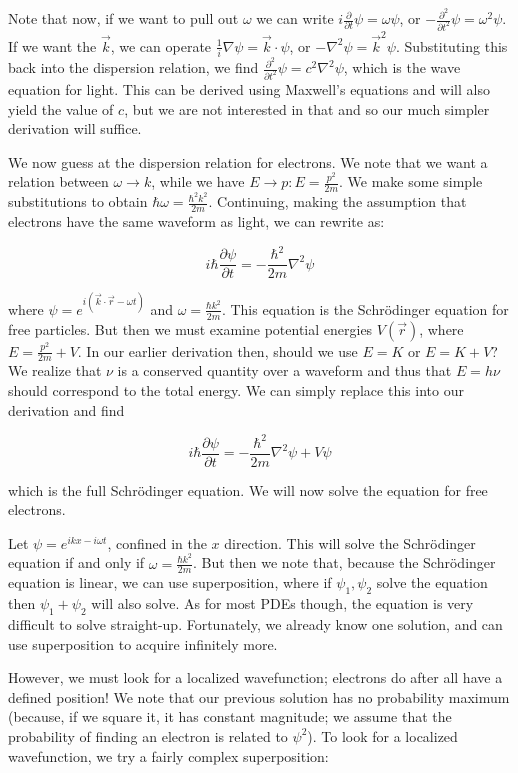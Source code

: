 \documentclass{report}
\begin{document}
Note that now, if we want to pull out $\omega$ we can write $i\frac{\partial}{\partial t}\psi = \omega \psi$, or $-\frac{\partial^2}{\partial t^2}\psi = \omega^2 \psi$. If we want the $\vec{k}$, we can operate $\frac{1}{i}\nabla\psi = \vec{k}\cdot\psi$, or $-\nabla^2\psi = \vec{k}^2\psi$. Substituting this back into the dispersion relation, we find $\frac{\partial^2}{\partial t^2}\psi = c^2\nabla^2\psi$, which is the wave equation for light. This can be derived using Maxwell's equations and will also yield the value of $c$, but we are not interested in that and so our much simpler derivation will suffice.

We now guess at the dispersion relation for electrons. We note that we want a relation between $\omega \to k$, while we have $E \to p: E = \frac{p^2}{2m}$. We make some simple substitutions to obtain $\hbar \omega = \frac{\hbar^2k^2}{2m}$. Continuing, making the assumption that electrons have the same waveform as light, we can rewrite as:

$$i\hbar\frac{\partial\psi}{\partial t} = -\frac{\hbar^2}{2m} \nabla^2 \psi$$

where $\psi = e^{i(\vec{k}\cdot\vec{r} - \omega t)}$ and $\omega = \frac{\hbar k^2}{2m}$. This equation is the Schr\"odinger equation for free particles. But then we must examine potential energies $V(\vec{r})$, where $E = \frac{p^2}{2m} + V$. In our earlier derivation then, should we use $E = K$ or $E = K + V$? We realize that $\nu$ is a conserved quantity over a waveform and thus that $E = h\nu$ should correspond to the total energy. We can simply replace this into our derivation and find

$$i\hbar\frac{\partial\psi}{\partial t} = -\frac{\hbar^2}{2m}\nabla^2\psi + V\psi$$

which is the full Schr\"odinger equation. We will now solve the equation for free electrons.

Let $\psi = e^{ikx - i\omega t}$, confined in the $x$ direction. This will solve the Schr\"odinger equation if and only if $\omega = \frac{\hbar k^2}{2m}$. But then we note that, because the Schr\"odinger equation is linear, we can use superposition, where if $\psi_1, \psi_2$ solve the equation then $\psi_1 + \psi_2$ will also solve. As for most PDEs though, the equation is very difficult to solve straight-up. Fortunately, we already know one solution, and can use superposition to acquire infinitely more.

However, we must look for a localized wavefunction; electrons do after all have a defined position! We note that our previous solution has no probability maximum (because, if we square it, it has constant magnitude; we assume that the probability of finding an electron is related to $\psi^2$). To look for a localized wavefunction, we try a fairly complex superposition:
\end{document}

